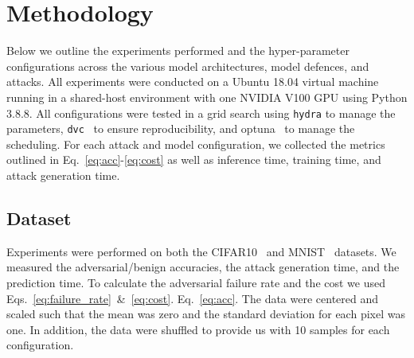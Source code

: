 \section{Methodology}
\label{methods}
Below we outline the experiments performed and the hyper-parameter configurations across the various model architectures, model defences, and attacks. All experiments were conducted on a Ubuntu 18.04 virtual machine running in a shared-host environment with one NVIDIA V100 GPU using Python 3.8.8. All configurations were tested in a grid search using \texttt{hydra} \citep{hydra} to manage the parameters, \texttt{dvc}~\citep{dvc} to ensure reproducibility, and optuna~\citep{optuna} to manage the scheduling. For each attack and model configuration, we collected the metrics outlined in Eq.~\ref{eq:acc}-\ref{eq:cost} as well as inference time, training time, and attack generation time.

\subsection{Dataset}
\label{dataset}
Experiments were performed on both the CIFAR10~\citep{cifar} and MNIST~\citep{mnist} datasets. We measured the adversarial/benign accuracies, the attack generation time, and the prediction time. To calculate the adversarial failure rate and the cost we used Eqs.~\ref{eq:failure_rate}~\&~\ref{eq:cost}. Eq.~\ref{eq:acc}. The data were centered and scaled such that the mean was zero and the standard deviation for each pixel was one. In addition, the data were shuffled to provide us with 10 samples for each configuration. 

